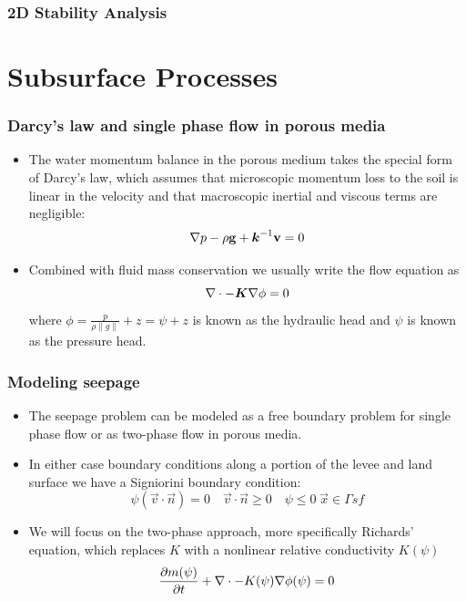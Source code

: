 \documentclass{beamer}
\begin{document}
\begin{frame}
\frametitle{2D Stability Analysis}
\end{frame}  

\section{Subsurface Processes}

\begin{frame}
  \frametitle{Darcy's law and single phase flow in porous media}
  \begin{itemize}
    \item The water momentum balance in the porous medium takes the
      special form of Darcy's law, which assumes that microscopic
      momentum loss to the soil is linear in the velocity and that
      macroscopic inertial and viscous terms are negligible:
    \begin{equation}
      \nabla p - \rho {\bf g}  + \mbox{{\boldmath ${k}$}}^{-1} {\bf v} = 0
    \end{equation}
    \item Combined with fluid mass conservation we usually write the flow equation as
      \begin{equation}
        \nabla \cdot  -\mbox{{\boldmath ${K}$}} \nabla \phi = 0 
      \end{equation}
      where $\phi = \frac{p}{\rho\|g\|} + z = \psi + z$ is known as the hydraulic head and $\psi$ is known as the pressure head.

  \end{itemize}
\end{frame}

\begin{frame}
  \frametitle{Modeling seepage}
  \begin{itemize}
    \item The seepage problem can be modeled as a free boundary
      problem for single phase flow or as two-phase flow in porous
      media.
    \item In either case boundary conditions along a portion of the
      levee and land surface we have a Signiorini boundary condition:
      \begin{equation}
\psi(\vec v \cdot \vec n) = 0 \quad \vec v \cdot \vec n \geq 0 \quad
\psi \leq 0 \; \vec x \in \Gamma{sf}
      \end{equation}
    \item We will focus on the two-phase approach, more specifically
      Richards' equation, which replaces $K$ with a nonlinear relative
      conductivity $K(\psi)$
      \begin{equation}
        \frac{\partial {m(\psi)}}{\partial {t}} + \nabla \cdot -K(\psi) \nabla \phi(\psi) = 0 
      \end{equation}
  \end{itemize}
\end{frame}
\end{document}

